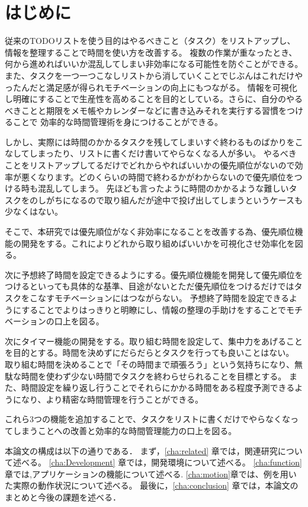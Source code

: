 \chapter{はじめに}
\label{cha:intro}

従来のTODOリストを使う目的はやるべきこと（タスク）をリストアップし、情報を整理することで時間を使い方を改善する。
複数の作業が重なったとき、何から進めればいいか混乱してしまい非効率になる可能性を防ぐことができる。
また、タスクを一つ一つこなしリストから消していくことでじぶんはこれだけやったんだと満足感が得られモチベーションの向上にもつながる。
情報を可視化し明確にすることで生産性を高めることを目的としている。さらに、自分のやるべきことと期限をメモ帳やカレンダーなどに書き込みそれを実行する習慣をつけることで
効率的な時間管理術を身につけることができる。

しかし、実際には時間のかかるタスクを残してしまいすぐ終わるものばかりをこなしてしまったり、リストに書くだけ書いてやらなくなる人が多い。
やるべきことをリストアップしてるだけでどれからやればいいかの優先順位がないので効率が悪くなります。どのくらいの時間で終わるかがわからないので優先順位をつける時も混乱してしまう。
先ほども言ったように時間のかかるような難しいタスクをのしがちになるので取り組んだが途中で投げ出してしまうというケースも少なくはない。

そこで、本研究では優先順位がなく非効率になることを改善する為、優先順位機能の開発をする。これによりどれから取り組めばいいかを可視化させ効率化を図る。

次に予想終了時間を設定できるようにする。優先順位機能を開発して優先順位をつけるといっても具体的な基準、目途がないとただ優先順位をつけるだけではタスクをこなすモチベーションにはつながらない。
予想終了時間を設定できるようにすることでよりはっきりと明瞭にし、情報の整理の手助けをすることでモチベーションの口上を図る。

次にタイマー機能の開発をする。取り組む時間を設定して、集中力をあげることを目的とする。時間を決めずにだらだらとタスクを行っても良いことはない。
取り組む時間を決めることで「その時間まで頑張ろう」という気持ちになり、無駄な時間を使わず少ない時間でタスクを終わらせられることを目標とする。
また、時間設定を繰り返し行うことでそれらにかかる時間をある程度予測できるようになり、より精密な時間管理を行うことができる。

これら3つの機能を追加することで、タスクをリストに書くだけでやらなくなってしまうことへの改善と効率的な時間管理能力の口上を図る。


本論文の構成は以下の通りである．
まず，\ref{cha:related} 章では，関連研究について述べる。
\ref{cha:Development} 章では，開発環境について述べる。
\ref{cha:function}章では,アプリケーションの機能について述べる.
\ref{cha:motion}章では、例を用いた実際の動作状況について述べる。
最後に，\ref{cha:conclusion} 章では，本論文のまとめと今後の課題を述べる．